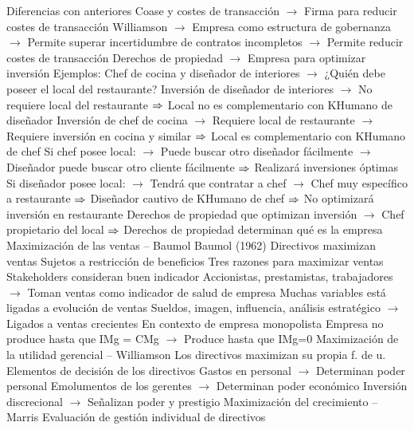 \documentclass{nuevotema}
\begin{document}
\begin{esquemal}
				\4 Diferencias con anteriores
				\4[] Coase y costes de transacción
				\4[] $\to$ Firma para reducir costes de transacción
				\4[] Williamson
				\4[] $\to$ Empresa como estructura de gobernanza
				\4[] $\to$ Permite superar incertidumbre de contratos incompletos
				\4[] $\to$ Permite reducir costes de transacción
				\4[] Derechos de propiedad
				\4[] $\to$ Empresa para optimizar inversión
				\4 Ejemplos:
				\4[] Chef de cocina y diseñador de interiores
				\4[] $\to$ ¿Quién debe poseer el local del restaurante?
				\4[] Inversión de diseñador de interiores
				\4[] $\to$ No requiere local del restaurante
				\4[] $\Rightarrow$ Local no es complementario con KHumano de diseñador
				\4[] Inversión de chef de cocina
				\4[] $\to$ Requiere local de restaurante
				\4[] $\to$ Requiere inversión en cocina y similar
				\4[] $\Rightarrow$ Local es complementario con KHumano de chef
				\4[] Si chef posee local:
				\4[] $\to$ Puede buscar otro diseñador fácilmente
				\4[] $\to$ Diseñador puede buscar otro cliente fácilmente
				\4[] $\Rightarrow$ Realizará inversiones óptimas
				\4[] Si diseñador posee local:
				\4[] $\to$ Tendrá que contratar a chef
				\4[] $\to$ Chef muy específico a restaurante
				\4[] $\Rightarrow$ Diseñador cautivo de KHumano de chef
				\4[] $\Rightarrow$ No optimizará inversión en restaurante
				\4[] Derechos de propiedad que optimizan inversión
				\4[] $\to$ Chef propietario del local
				\4[] $\Rightarrow$ Derechos de propiedad determinan qué es la empresa
			\3 Maximización de las ventas -- Baumol
				\4 Baumol (1962)
				\4 Directivos maximizan ventas
				\4[] Sujetos a restricción de beneficios
				\4 Tres razones para maximizar ventas
				\4[i] Stakeholders consideran buen indicador
				\4[] Accionistas, prestamistas, trabajadores
				\4[] $\to$ Toman ventas como indicador de salud de empresa
				\4[ii] Muchas variables está ligadas a evolución de ventas
				\4[] Sueldos, imagen, influencia, análisis estratégico
				\4[] $\to$ Ligados a ventas crecientes
				\4 En contexto de empresa monopolista
				\4[] Empresa no produce hasta que IMg = CMg
				\4[] $\to$ Produce hasta que IMg=0
			\3 Maximización de la utilidad gerencial -- Williamson
				\4 Los directivos maximizan su propia f. de u.
				\4 Elementos de decisión de los directivos
				\4[] Gastos en personal
				\4[] $\to$ Determinan poder personal
				\4[] Emolumentos de los gerentes
				\4[] $\to$ Determinan poder económico
				\4[] Inversión discrecional
				\4[] $\to$ Señalizan poder y prestigio
			\3 Maximización del crecimiento -- Marris
				\4 Evaluación de gestión individual de directivos

\end{esquemal}
\end{document}
